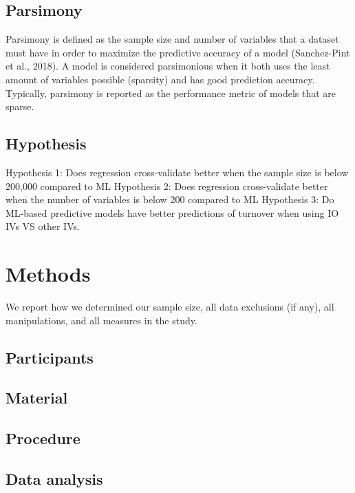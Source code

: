\documentclass[
  man]{apa6}
\begin{document}
\hypertarget{parsimony}{%
\subsection{Parsimony}\label{parsimony}}

Parsimony is defined as the sample size and number of variables that a dataset must have in order to maximize the predictive accuracy of a model (Sanchez-Pint et al., 2018). A model is considered parsimonious when it both uses the least amount of variables possible (sparsity) and has good prediction accuracy. Typically, parsimony is reported as the performance metric of models that are sparse.

\hypertarget{hypothesis}{%
\subsection{Hypothesis}\label{hypothesis}}

Hypothesis 1: Does regression cross-validate better when the sample size is below 200,000 compared to ML
Hypothesis 2: Does regression cross-validate better when the number of variables is below 200 compared to ML
Hypothesis 3: Do ML-based predictive models have better predictions of turnover when using IO IVs VS other IVs.

\hypertarget{methods}{%
\section{Methods}\label{methods}}

We report how we determined our sample size, all data exclusions (if any), all manipulations, and all measures in the study.

\hypertarget{participants}{%
\subsection{Participants}\label{participants}}

\hypertarget{material}{%
\subsection{Material}\label{material}}

\hypertarget{procedure}{%
\subsection{Procedure}\label{procedure}}

\hypertarget{data-analysis}{%
\subsection{Data analysis}\label{data-analysis}}
\end{document}

